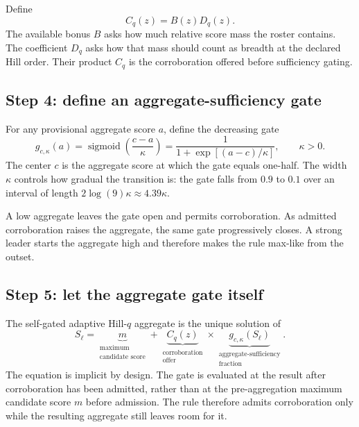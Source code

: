 \documentclass[11pt]{article}
\newcommand{\sigmoid}{\operatorname{sigmoid}}
\begin{document}
Define
\begin{equation}
C_q(z)=B(z)D_q(z).
\label{eq:corroboration-offer}
\end{equation}
The available bonus $B$ asks how much relative score mass the roster contains.
The coefficient $D_q$ asks how that mass should count as breadth at the
declared Hill order. Their product $C_q$ is the corroboration offered before
sufficiency gating.

\subsection{Step 4: define an aggregate-sufficiency gate}

For any provisional aggregate score $a$, define the decreasing gate
\begin{equation}
g_{c,\kappa}(a)
=
\sigmoid\!\left(\frac{c-a}{\kappa}\right)
=
\frac{1}{1+\exp[(a-c)/\kappa]},
\qquad \kappa>0.
\label{eq:aggregate-gate}
\end{equation}
The center $c$ is the aggregate score at which the gate equals one-half. The
width $\kappa$ controls how gradual the transition is: the gate falls from
$0.9$ to $0.1$ over an interval of length
$2\log(9)\kappa\approx4.39\kappa$.

A low aggregate leaves the gate open and permits corroboration. As admitted
corroboration raises the aggregate, the same gate progressively closes. A
strong leader starts the aggregate high and therefore makes the rule max-like
from the outset.

\subsection{Step 5: let the aggregate gate itself}

The self-gated adaptive Hill-$q$ aggregate is the unique solution of
\begin{equation}
\boxed{
S_\ell
=
\underbrace{m}_{\substack{\text{maximum}\\\text{candidate score}}}
+
\underbrace{C_q(z)}_{\substack{\text{corroboration}\\\text{offer}}}
\times
\underbrace{g_{c,\kappa}\!\left(S_\ell\right)}_
{\substack{\text{aggregate-sufficiency}\\\text{fraction}}}
}.
\label{eq:self-gated-aggregate}
\end{equation}
The equation is implicit by design. The gate is evaluated at the result after
corroboration has been admitted, rather than at the pre-aggregation maximum
candidate score $m$ before admission.
The rule therefore admits corroboration only while the resulting aggregate
still leaves room for it.
\end{document}
